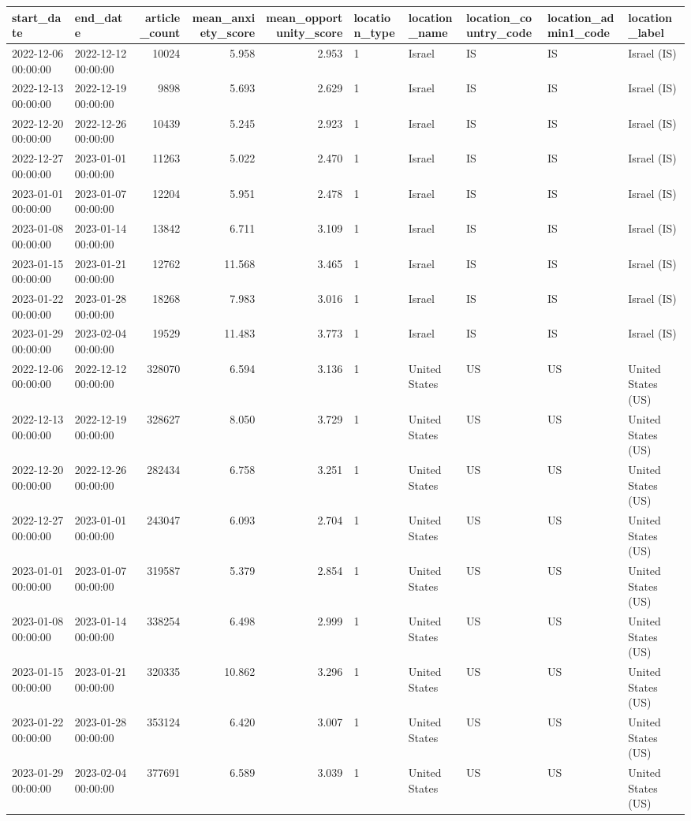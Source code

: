 \begin{tabular}{llrrrlllll}
\toprule
start\_date & end\_date & article\_count & mean\_anxiety\_score & mean\_opportunity\_score & location\_type & location\_name & location\_country\_code & location\_admin1\_code & location\_label \\
\midrule
2022-12-06 00:00:00 & 2022-12-12 00:00:00 & 10024 & 5.958 & 2.953 & 1 & Israel & IS & IS & Israel (IS) \\
2022-12-13 00:00:00 & 2022-12-19 00:00:00 & 9898 & 5.693 & 2.629 & 1 & Israel & IS & IS & Israel (IS) \\
2022-12-20 00:00:00 & 2022-12-26 00:00:00 & 10439 & 5.245 & 2.923 & 1 & Israel & IS & IS & Israel (IS) \\
2022-12-27 00:00:00 & 2023-01-01 00:00:00 & 11263 & 5.022 & 2.470 & 1 & Israel & IS & IS & Israel (IS) \\
2023-01-01 00:00:00 & 2023-01-07 00:00:00 & 12204 & 5.951 & 2.478 & 1 & Israel & IS & IS & Israel (IS) \\
2023-01-08 00:00:00 & 2023-01-14 00:00:00 & 13842 & 6.711 & 3.109 & 1 & Israel & IS & IS & Israel (IS) \\
2023-01-15 00:00:00 & 2023-01-21 00:00:00 & 12762 & 11.568 & 3.465 & 1 & Israel & IS & IS & Israel (IS) \\
2023-01-22 00:00:00 & 2023-01-28 00:00:00 & 18268 & 7.983 & 3.016 & 1 & Israel & IS & IS & Israel (IS) \\
2023-01-29 00:00:00 & 2023-02-04 00:00:00 & 19529 & 11.483 & 3.773 & 1 & Israel & IS & IS & Israel (IS) \\
2022-12-06 00:00:00 & 2022-12-12 00:00:00 & 328070 & 6.594 & 3.136 & 1 & United States & US & US & United States (US) \\
2022-12-13 00:00:00 & 2022-12-19 00:00:00 & 328627 & 8.050 & 3.729 & 1 & United States & US & US & United States (US) \\
2022-12-20 00:00:00 & 2022-12-26 00:00:00 & 282434 & 6.758 & 3.251 & 1 & United States & US & US & United States (US) \\
2022-12-27 00:00:00 & 2023-01-01 00:00:00 & 243047 & 6.093 & 2.704 & 1 & United States & US & US & United States (US) \\
2023-01-01 00:00:00 & 2023-01-07 00:00:00 & 319587 & 5.379 & 2.854 & 1 & United States & US & US & United States (US) \\
2023-01-08 00:00:00 & 2023-01-14 00:00:00 & 338254 & 6.498 & 2.999 & 1 & United States & US & US & United States (US) \\
2023-01-15 00:00:00 & 2023-01-21 00:00:00 & 320335 & 10.862 & 3.296 & 1 & United States & US & US & United States (US) \\
2023-01-22 00:00:00 & 2023-01-28 00:00:00 & 353124 & 6.420 & 3.007 & 1 & United States & US & US & United States (US) \\
2023-01-29 00:00:00 & 2023-02-04 00:00:00 & 377691 & 6.589 & 3.039 & 1 & United States & US & US & United States (US) \\
\bottomrule
\end{tabular}
